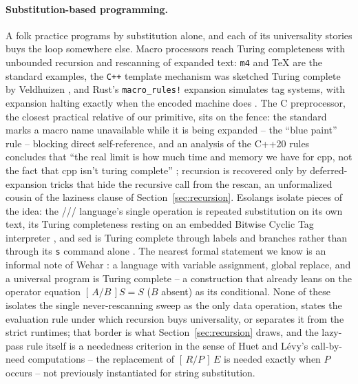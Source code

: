 \documentclass[runningheads,envcountsect]{llncs}
\begin{document}
\paragraph{Substitution-based programming.} A folk practice programs by substitution alone, and each of its universality stories buys the loop somewhere else. Macro processors reach Turing completeness with unbounded recursion and rescanning of expanded text: \texttt{m4} \cite{kernighan77m4} and \TeX{} \cite{knuth84} are the standard examples, the \texttt{C++} template mechanism was sketched Turing complete by Veldhuizen \cite{veldhuizen95tc}, and Rust's \texttt{macro\_rules!} expansion simulates tag systems, with expansion halting exactly when the encoded machine does \cite{tlborm}. The C preprocessor, the closest practical relative of our primitive, sits on the fence: the standard marks a macro name unavailable while it is being expanded -- the ``blue paint'' rule -- blocking direct self-reference, and an analysis of the C++20 rules concludes that ``the real limit is how much time and memory we have for cpp, not the fact that cpp isn't turing complete'' \cite{mazieres21}; recursion is recovered only by deferred-expansion tricks that hide the recursive call from the rescan, an unformalized cousin of the laziness clause of Section~\ref{sec:recursion}. Esolangs isolate pieces of the idea: the /// language's single operation is repeated substitution on its own text, its Turing completeness resting on an embedded Bitwise Cyclic Tag interpreter \cite{slashes}, and sed is Turing complete through labels and branches rather than through its \texttt{s} command alone \cite{krumins-sed}. The nearest formal statement we know is an informal note of Wehar \cite{wehar}: a language with variable assignment, global replace, and a universal program is Turing complete -- a construction that already leans on the operator equation $[\,A/B\,]S = S$ ($B$ absent) as its conditional. None of these isolates the single never-rescanning sweep as the only data operation, states the evaluation rule under which recursion buys universality, or separates it from the strict runtimes; that border is what Section~\ref{sec:recursion} draws, and the lazy-pass rule itself is a neededness criterion in the sense of Huet and L\'evy's call-by-need computations \cite{huetlevy79} -- the replacement of $[\,R/P\,]\,E$ is needed exactly when $P$ occurs -- not previously instantiated for string substitution.
\end{document}
